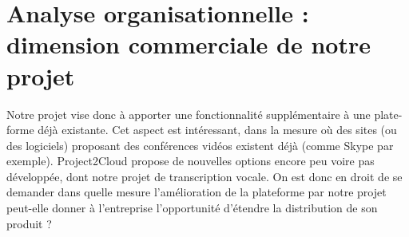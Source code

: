 	\section{Analyse organisationnelle : dimension commerciale de notre projet}
	Notre projet vise donc à apporter une fonctionnalité supplémentaire à une plate-forme déjà existante. Cet aspect est intéressant, dans la mesure où des sites (ou des logiciels) proposant des conférences vidéos existent déjà (comme Skype par exemple). Project2Cloud propose de nouvelles options encore peu voire pas développée, dont notre projet de transcription vocale. On est donc en droit de se demander dans quelle mesure l'amélioration de la plateforme par notre projet peut-elle donner à l'entreprise l'opportunité d'étendre la distribution de son produit ?